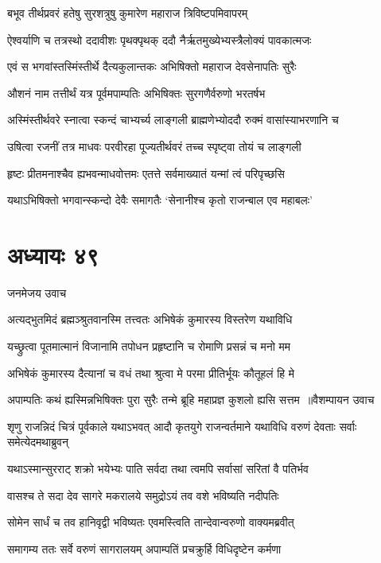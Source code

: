 \twolineshloka
{बभूव तीर्थप्रवरं हतेषु सुरशत्रुषु}
{कुमारेण महाराज त्रिविष्टपमिवापरम्}


\twolineshloka
{ऐश्वर्याणि च तत्रस्थो ददावीशः पृथक्पृथक्}
{ददौ नैर्ऋतमुख्येभ्यस्त्रैलोक्यं पावकात्मजः}


\twolineshloka
{एवं स भगवांस्तस्मिंस्तीर्थे दैत्यकुलान्तकः}
{अभिषिक्तो महाराज देवसेनापतिः सुरैः}


\twolineshloka
{औशनं नाम तत्तीर्थं यत्र पूर्वमपाम्पतिः}
{अभिषिक्तः सुरगणैर्वरुणो भरतर्षभ}


\twolineshloka
{अस्मिंस्तीर्थवरे स्नात्वा स्कन्दं चाभ्यर्च्य लाङ्गली}
{ब्राह्मणेभ्योददौ रुक्मं वासांस्याभरणानि च}


\twolineshloka
{उषित्वा रजनीं तत्र माधवः परवीरहा}
{पूज्यतीर्थवरं तच्च स्पृष्ट्वा तोयं च लाङ्गली}


\twolineshloka
{हृष्टः प्रीतमनाश्चैव ह्यभवन्माधवोत्तमः}
{एतत्ते सर्वमाख्यातं यन्मां त्वं परिपृच्छसि}


\twolineshloka
{यथाऽभिषिक्तो भगवान्स्कन्दो देवैः समागतैः}
{`सेनानीश्च कृतो राजन्बाल एव महाबलः'}


\chapter{अध्यायः ४९}
\twolineshloka
{जनमेजय उवाच}
{}


\twolineshloka
{अत्यद्भुतमिदं ब्रह्मञ्श्रुतवानस्मि तत्त्वतः}
{अभिषेकं कुमारस्य विस्तरेण यथाविधि}


\twolineshloka
{यच्छ्रुत्वा पूतमात्मानं विजानामि तपोधन}
{प्रहृष्टानि च रोमाणि प्रसन्नं च मनो मम}


\twolineshloka
{अभिषेकं कुमारस्य दैत्यानां च वधं तथा}
{श्रुत्वा मे परमा प्रीतिर्भूयः कौतूहलं हि मे}


\threelineshloka
{अपाम्पतिः कथं ह्यस्मिन्नभिषिक्तः पुरा सुरैः}
{तन्मे ब्रूहि महाप्रज्ञ कुशलो ह्यसि सत्तम ॥वैशम्पायन उवाच}
{}


शृणु राजन्निदं चित्रं पूर्वकाले यथाऽभवत्
\twolineshloka
{आदौ कृतयुगे राजन्वर्तमाने यथाविधि}
{वरुणं देवताः सर्वाः समेत्येदमथाब्रुवन्}


\twolineshloka
{यथाऽस्मान्सुरराट् शक्रो भयेभ्यः पाति सर्वदा}
{तथा त्वमपि सर्वासां सरितां वै पतिर्भव}


\twolineshloka
{वासश्च ते सदा देव सागरे मकरालये}
{समुद्रोऽयं तव वशे भविष्यति नदीपतिः}


\twolineshloka
{सोमेन सार्धं च तव हानिवृद्वी भविष्यतः}
{एवमस्त्विति तान्देवान्वरुणो वाक्यमब्रवीत्}


\twolineshloka
{समागम्य ततः सर्वे वरुणं सागरालयम्}
{अपाम्पतिं प्रचक्रुर्हि विधिदृष्टेन कर्मणा}


